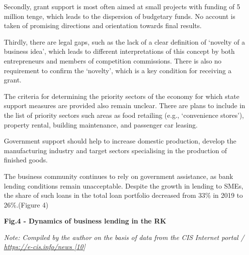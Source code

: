 \begin{multicols}{2}
Secondly, grant support is most often aimed at small projects with
funding of 5 million tenge, which leads to the dispersion of budgetary
funds. No account is taken of promising directions and orientation
towards final results.

Thirdly, there are legal gaps, such as the lack of a clear definition of
`novelty of a business idea', which leads to different interpretations
of this concept by both entrepreneurs and members of competition
commissions. There is also no requirement to confirm the `novelty',
which is a key condition for receiving a grant.

The criteria for determining the priority sectors of the economy for
which state support measures are provided also remain unclear. There are
plans to include in the list of priority sectors such areas as food
retailing (e.g., `convenience stores'), property rental, building
maintenance, and passenger car leasing.

Government support should help to increase domestic production, develop
the manufacturing industry and target sectors specialising in the
production of finished goods.

The business community continues to rely on government assistance, as
bank lending conditions remain unacceptable. Despite the growth in
lending to SMEs, the share of such loans in the total loan portfolio
decreased from 33\% in 2019 to 26\%.(Figure 4)
\end{multicols}

{\bfseries Fig.4 - Dynamics of business lending in the RK}

\emph{Note: Compiled by the author on the basis of data from the CIS
Internet portal /
\href{https://e-cis.info/news\%20\%5b10}{https://e-cis.info/news
{[}10}{]}}

